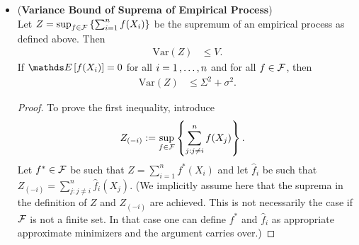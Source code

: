 \documentclass[11pt]{article}
\begin{document}
\begin{itemize}
\item \begin{theorem} (\textbf{Variance Bound of Suprema of Empirical Process}) \citep{boucheron2013concentration}\\
Let $Z =  \sup_{f \in {\mathcal F}}\left\{\sum_{i=1}^n f(X_i)\right\}$ be the supremum of an empirical process as defined above. Then
\begin{align}
\text{Var}(Z) &\le V. \label{ineqn: strong_variance_bound_sup_emp_process}
\end{align}
If $\E{}{f(X_i)} =0$ for all $i = 1 \,{,}\ldots{,}\, n$ and for all $f \in {\mathcal F}$, then
\begin{align}
\text{Var}(Z) &\le \Sigma^2 + \sigma^2. \label{ineqn: weak_wimpy_variance_bound_sup_emp_process}
\end{align}
\end{theorem}
\begin{proof}
To prove the first inequality, introduce 
\begin{align*}
Z_{(-i)} &:= \sup_{f \in {\mathcal F}}\left\{\sum_{j: j\neq i}^n f(X_j)\right\}.
\end{align*} Let $f^{*} \in {\mathcal F}$ be such that $Z =\sum_{i=1}^n f^{*}(X_i)$ and let $\hat{f}_i$ be such that $Z_{(-i)} = \sum_{j: j\neq i}^n \hat{f}_i(X_j)$. (We implicitly assume here that the suprema in the definition of $Z$ and $Z_{(-i)}$ are achieved. This is not necessarily the case if ${\mathcal F}$ is not a finite set. In that case one can define  $f^{*}$ and $\hat{f}_i$ as appropriate approximate minimizers and the argument carries over.) 


\end{proof}
\end{itemize}
\end{document}
